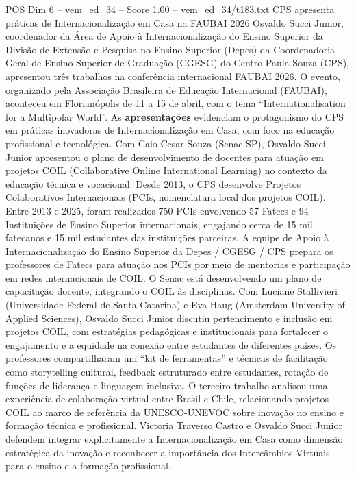 \begin{textsample}{POS Dim 6 – vem\_ed\_34 – Score 1.00 – vem\_ed\_34/t183.txt}  \label{ex:f6_pos_158}
CPS apresenta práticas de Internacionalização em Casa na FAUBAI 2026 Osvaldo Succi Junior, coordenador da Área de Apoio à Internacionalização do Ensino Superior da Divisão de Extensão e Pesquisa no Ensino Superior (Depes) da Coordenadoria Geral de Ensino Superior de Graduação (CGESG) do Centro Paula Souza (CPS), apresentou três trabalhos na conferência internacional FAUBAI 2026.
O evento, organizado pela Associação Brasileira de Educação Internacional (FAUBAI), aconteceu em Florianópolis de 11 a 15 de abril, com o tema “Internationalisation for a Multipolar World”.
As \textbf{apresentações} evidenciam o protagonismo do CPS em práticas inovadoras de Internacionalização em Casa, com foco na educação profissional e tecnológica.
Com Caio Cesar Souza (Senac-SP), Osvaldo Succi Junior apresentou o plano de desenvolvimento de docentes para atuação em projetos COIL (Collaborative Online International Learning) no contexto da educação técnica e vocacional.
Desde 2013, o CPS desenvolve Projetos Colaborativos Internacionais (PCIs, nomenclatura local dos projetos COIL).
Entre 2013 e 2025, foram realizados 750 PCIs envolvendo 57 Fatecs e 94 Instituições de Ensino Superior internacionais, engajando cerca de 15 mil fatecanos e 15 mil estudantes das instituições parceiras.
A equipe de Apoio à Internacionalização do Ensino Superior da Depes / CGESG / CPS prepara os professores de Fatecs para atuação nos PCIs por meio de mentorias e participação em redes internacionais de COIL.
O Senac está desenvolvendo um plano de capacitação docente, integrando o COIL às disciplinas.
Com Luciane Stallivieri (Universidade Federal de Santa Catarina) e Eva Haug (Amsterdam University of Applied Sciences), Osvaldo Succi Junior discutiu pertencimento e inclusão em projetos COIL, com estratégias pedagógicas e institucionais para fortalecer o engajamento e a equidade na conexão entre estudantes de diferentes países.
Os professores compartilharam um “kit de ferramentas” e técnicas de facilitação como storytelling cultural, feedback estruturado entre estudantes, rotação de funções de liderança e linguagem inclusiva.
O terceiro trabalho analisou uma experiência de colaboração virtual entre Brasil e Chile, relacionando projetos COIL ao marco de referência da UNESCO-UNEVOC sobre inovação no ensino e formação técnica e profissional.
Victoria Traverso Castro e Osvaldo Succi Junior defendem integrar explicitamente a Internacionalização em Casa como dimensão estratégica da inovação e reconhecer a importância dos Intercâmbios Virtuais para o ensino e a formação profissional.

\end{textsample}

